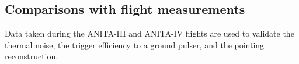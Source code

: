 %
%
%
%



\subsection{Comparisons with flight measurements}
\label{subsec:validation_flight}
Data taken during the ANITA-III and ANITA-IV flights are used to validate 
the thermal noise, the trigger efficiency to a ground pulser, and the pointing reconstruction.

